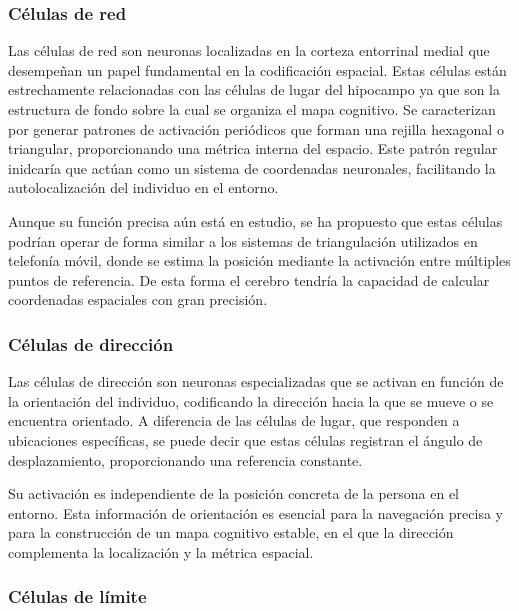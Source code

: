    \subsubsection{Células de red}
    
    Las células de red son neuronas localizadas en la corteza entorrinal medial que desempeñan un papel fundamental en la codificación espacial. Estas células están estrechamente relacionadas con las células de lugar del hipocampo ya que son la estructura de fondo sobre la cual se organiza el mapa cognitivo. Se caracterizan por generar patrones de activación periódicos que forman una rejilla hexagonal o triangular, proporcionando una métrica interna del espacio. Este patrón regular inidcaría que actúan como un sistema de coordenadas neuronales, facilitando la autolocalización del individuo en el entorno.\cite{MapaCognitivo_O_KEEFE, GPSCerebral_MOSER, TiposCelulas_GPSCerebral, ManualDeBusquedayRescate}
    
    Aunque su función precisa aún está en estudio, se ha propuesto que estas células podrían operar de forma similar a los sistemas de triangulación utilizados en telefonía móvil, donde se estima la posición mediante la activación entre múltiples puntos de referencia. De esta forma el cerebro tendría la capacidad de calcular coordenadas espaciales con gran precisión.
    

    \subsubsection{Células de dirección}
    
    Las células de dirección son neuronas especializadas que se activan en función de la orientación del individuo, codificando la dirección hacia la que se mueve o se encuentra orientado. A diferencia de las células de lugar, que responden a ubicaciones específicas, se puede decir que estas células registran el ángulo de desplazamiento, proporcionando una referencia constante.\cite{MapaCognitivo_O_KEEFE, TiposCelulas_GPSCerebral, ManualDeBusquedayRescate}
    
    Su activación es independiente de la posición concreta de la persona en el entorno. Esta información de orientación es esencial para la navegación precisa y para la construcción de un mapa cognitivo estable, en el que la dirección complementa la localización y la métrica espacial.
    

    \subsubsection{Células de límite}
    
